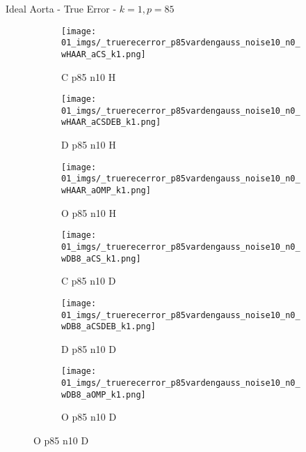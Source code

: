 \begin{frame}{Ideal Aorta - True Error - $k=1,p=85$}{}
\begin{figure}
\begin{subfigure}{0.13\textwidth}
\texttt{[image: 01\_imgs/\_truerecerror\_p85vardengauss\_noise10\_n0\_wHAAR\_aCS\_k1.png]}
\caption*{\tiny C p85 n10 H}
\end{subfigure}
\begin{subfigure}{0.13\textwidth}
\texttt{[image: 01\_imgs/\_truerecerror\_p85vardengauss\_noise10\_n0\_wHAAR\_aCSDEB\_k1.png]}
\caption*{\tiny D p85 n10 H}
\end{subfigure}
\begin{subfigure}{0.13\textwidth}
\texttt{[image: 01\_imgs/\_truerecerror\_p85vardengauss\_noise10\_n0\_wHAAR\_aOMP\_k1.png]}
\caption*{\tiny O p85 n10 H}
\end{subfigure}
\begin{subfigure}{0.13\textwidth}
\texttt{[image: 01\_imgs/\_truerecerror\_p85vardengauss\_noise10\_n0\_wDB8\_aCS\_k1.png]}
\caption*{\tiny C p85 n10 D}
\end{subfigure}
\begin{subfigure}{0.13\textwidth}
\texttt{[image: 01\_imgs/\_truerecerror\_p85vardengauss\_noise10\_n0\_wDB8\_aCSDEB\_k1.png]}
\caption*{\tiny D p85 n10 D}
\end{subfigure}
\begin{subfigure}{0.13\textwidth}
\texttt{[image: 01\_imgs/\_truerecerror\_p85vardengauss\_noise10\_n0\_wDB8\_aOMP\_k1.png]}
\caption*{\tiny O p85 n10 D}
\end{subfigure}

\vspace{5pt}


\end{figure}
\end{frame}
